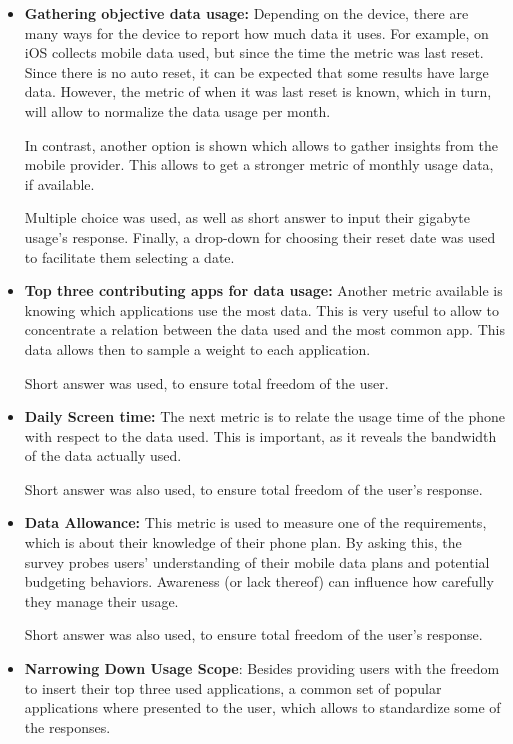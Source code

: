 \documentclass[conference]{IEEEtran}
\begin{document}
\begin{itemize}
    \item \textbf{Gathering objective data usage:} Depending on the device, there are many ways for the device to report how much data it uses. For example, on iOS collects mobile data used, but since the time the metric was last reset. Since there is no auto reset, it can be expected that some results have large data. However, the metric of when it was last reset is known, which in turn, will allow to normalize the data usage per month.
    
    In contrast, another option is shown which allows to gather insights from the mobile provider. This allows to get a stronger metric of monthly usage data, if available.
    
    Multiple choice was used, as well as short answer to input their gigabyte usage's response. Finally, a drop-down for choosing their reset date was used to facilitate them selecting a date. 
    \item \textbf{Top three contributing apps for data usage:} Another metric available is knowing which applications use the most data. This is very useful to allow to concentrate a relation between the data used and the most common app. This data allows then to sample a weight to each application.
    
    Short answer was used, to ensure total freedom of the user.
    \item \textbf{Daily Screen time:} The next metric is to relate the usage time of the phone with respect to the data used. This is important, as it reveals the bandwidth of the data actually used. 
    
    Short answer was also used, to ensure total freedom of the user's response.
    \item \textbf{Data Allowance:} This metric is used to measure one of the requirements, which is about their knowledge of their phone plan. By asking this, the survey probes users’ understanding of their mobile data plans and potential budgeting behaviors. Awareness (or lack thereof) can influence how carefully they manage their usage.
    
    Short answer was also used, to ensure total freedom of the user's response.
    \item \textbf{Narrowing Down Usage Scope}: Besides providing users with the freedom to insert their top three used applications, a common set of popular applications where presented to the user, which allows to standardize some of the responses.
    

\end{itemize}
\end{document}
